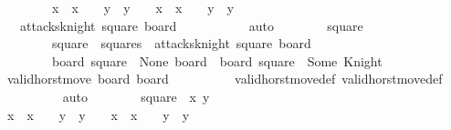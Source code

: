 \begin{isabellebody}
\ \ \ \ \ \ \ \ {\isachardoublequoteopen}{\isasymbar}x\ {\isacharminus}\ x{\isacharprime}{\isasymbar}\ {\isacharequal}\ {}\ {\isasymand}\ {\isasymbar}y\ {\isacharminus}\ y{\isacharprime}{\isasymbar}\ {\isacharequal}\ {}\ {\isasymor}\ {\isasymbar}x\ {\isacharminus}\ x{\isacharprime}{\isasymbar}\ {\isacharequal}\ {}\ {\isasymand}\ {\isasymbar}y\ {\isacharminus}\ y{\isacharprime}{\isasymbar}\ {\isacharequal}\ {}{\isachardoublequoteclose}\isanewline
\ \ \ \ \ \ \ \ \isamarkupfalse%
\ {\isacartoucheopen}{\isasymnot}\ {\isasymnot}\ attacks{\isacharunderscore}knight\ square\ board{\isacharprime}{\isacartoucheclose}\ \isanewline
\ \ \ \ \ \ \ \ \isamarkupfalse%
\ auto\isanewline
\ \ \ \ \ \ \isamarkupfalse%
\ square{\isacharprime}\ \ \isanewline
\ \ \ \ \ \ \ \ {\isachardoublequoteopen}square{\isacharprime}\ {\isasymin}\ squares{\isachardoublequoteclose}\ {\isachardoublequoteopen}{\isasymnot}\ attacks{\isacharunderscore}knight\ square{\isacharprime}\ board{\isachardoublequoteclose}\isanewline
\ \ \ \ \ \ \ \ {\isachardoublequoteopen}board\ square{\isacharprime}\ {\isacharequal}\ None{\isachardoublequoteclose}\ {\isachardoublequoteopen}board{\isacharprime}\ {\isacharequal}\ board\ {\isacharparenleft}square{\isacharprime}\ {\isacharcolon}{\isacharequal}\ Some\ Knight{\isacharparenright}{\isachardoublequoteclose}\isanewline
\ \ \ \ \ \ \ \ \isamarkupfalse%
\ {\isacharbackquoteopen}valid{\isacharunderscore}horst{\isacharunderscore}move\ board\ board{\isacharprime}{\isacharbackquoteclose}\isanewline
\ \ \ \ \ \ \ \ \isamarkupfalse%
\ valid{\isacharunderscore}horst{\isacharunderscore}move{\isacharunderscore}def\ valid{\isacharunderscore}horst{\isacharunderscore}move{\isacharprime}{\isacharunderscore}def\isanewline
\ \ \ \ \ \ \ \ \isamarkupfalse%
\ auto\isanewline
\ \ \ \ \ \ \isamarkupfalse%
\ {\isachardoublequoteopen}square{\isacharprime}\ {\isacharequal}\ {\isacharparenleft}x{\isacharprime}{\isacharcomma}\ y{\isacharprime}{\isacharparenright}{\isachardoublequoteclose}\isanewline
\ \ \ \ \ \ \ \ \isamarkupfalse%
\ {\isacartoucheopen}{\isasymbar}x\ {\isacharminus}\ x{\isacharprime}{\isasymbar}\ {\isacharequal}\ {}\ {\isasymand}\ {\isasymbar}y\ {\isacharminus}\ y{\isacharprime}{\isasymbar}\ {\isacharequal}\ {}\ {\isasymor}\ {\isasymbar}x\ {\isacharminus}\ x{\isacharprime}{\isasymbar}\ {\isacharequal}\ {}\ {\isasymand}\ {\isasymbar}y\ {\isacharminus}\ y{\isacharprime}{\isasymbar}\ {\isacharequal}\ {}{\isacartoucheclose}\isanewline

\end{isabellebody}
